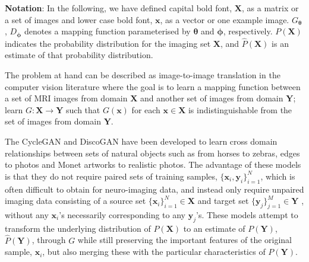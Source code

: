 \textbf{Notation}: In the following, we have defined capital bold font, $\mathbf{X}$, as a matrix or a set of images and lower case bold font, $\mathbf{x}$, as a vector or one example image. $G_\mathbf{\theta}$, $D_\mathbf{\phi}$ denotes a mapping function parameterised by $\mathbf{\theta}$ and $\mathbf{\phi}$, respectively. $P(\mathbf{X})$ indicates the probability distribution for the imaging set $\mathbf{X}$, and $\hat{P}(\mathbf{X})$ is an estimate of that probability distribution.

The problem at hand can be described as image-to-image translation in the computer vision literature where the goal is to learn a mapping function between a set of MRI images from domain $\mathbf{X}$ and another set of images from domain $\mathbf{Y}$; learn $G: \mathbf{X}\rightarrow \mathbf{Y}$ such that $G(\mathbf{x})$ for each $\mathbf{x} \in \mathbf{X}$ is indistinguishable from the set of images from domain $\mathbf{Y}$.

The CycleGAN \citep{zhu2017unpaired} and DiscoGAN \citep{kim2017learning} have been developed to learn cross domain relationships between sets of natural objects such as from horses to zebras, edges to photos and Monet artworks to realistic photos. The advantage of these models is that they do not require paired sets of training samples, $\{\mathbf{x}_i,\mathbf{y}_i\}^N_{i=1}$, which is often difficult to obtain for neuro-imaging data, and instead only require unpaired imaging data consisting of a source set $\{\mathbf{x}_i\}^N_{i=1}\in \mathbf{X}$ and target set $\{\mathbf{y}_j\}^M_{j=1} \in \mathbf{Y}$ , without any $\mathbf{x}_i$'s necessarily corresponding to any $\mathbf{y}_j$'s. These models attempt to transform the underlying distribution of $P(\mathbf{X})$ to an estimate of $P(\mathbf{Y})$, $\hat{P}(\mathbf{Y})$, through $G$ while still preserving the important features of the original sample, $\mathbf{x}_i$, but also merging these with the particular characteristics of $P(\mathbf{Y})$.

